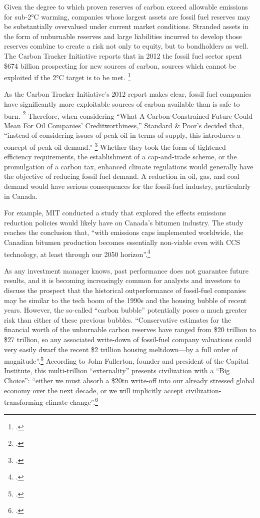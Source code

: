 \documentclass[10pt]{article}
\begin{document}
Given the degree to which proven reserves of carbon exceed allowable emissions for sub-2°C warming, companies whose largest assets are fossil fuel reserves may be substantially overvalued under current market conditions. 
Stranded assets in the form of unburnable reserves and large liabilities incurred to develop those reserves combine to create a risk not only to equity, but to bondholders as well.
The Carbon Tracker Initiative reports that in 2012 the fossil fuel sector spent \$674 billion prospecting for new sources of carbon, sources which cannot be exploited if the 2°C target is to be met. \footcite{CTI2013}


As the Carbon Tracker Initiative's 2012 report makes clear, fossil fuel companies have significantly more exploitable sources of carbon available than is safe to burn. \footcite{CTI2012}
Therefore, when considering ``What A Carbon-Constrained Future Could Mean For Oil Companies' Creditworthiness,'' Standard \& Poor's decided that, ``instead of considering issues of peak oil in terms of supply, this introduces a concept of peak oil demand.'' \footcite{SandPConstrained}
Whether they took the form of tightened efficiency requirements, the establishment of a cap-and-trade scheme, or the promulgation of a carbon tax, enhanced climate regulations would generally have the objective of reducing fossil fuel demand.
A reduction in oil, gas, and coal demand would have serious consequences for the fossil-fuel industry, particularly in Canada.



For example, MIT conducted a study that explored the effects  emissions reduction policies would likely have on Canada's bitumen industry.
The study reaches the conclusion that, ``with  emissions caps implemented worldwide, the Canadian bitumen production becomes essentially non-viable even with CCS technology, at least through our 2050 horizon''.\footcite{MITConstraints}



As any investment manager knows, past performance does not guarantee future results, and it is becoming increasingly common for analysts and investors to discuss the prospect that the historical outperformance of fossil-fuel companies may be similar to the tech boom of the 1990s and the housing bubble of recent years.
However, the so-called ``carbon bubble'' potentially poses a much greater risk than either of these previous bubbles.
``Conservative estimates for the financial worth of the unburnable carbon reserves have ranged from \$20 trillion to \$27 trillion, so any associated write-down of fossil-fuel company valuations could very easily dwarf the recent \$2 trillion housing meltdown—by a full order of magnitude''.\footcite[][p. 3]{FossilFreeInvesting}
According to John Fullerton, founder and president of the Capital Institute, this multi-trillion ``externality'' presents civilization with a ``Big Choice'': ``either we must absorb a \$20tn write-off into our already stressed global economy over the next decade, or we will implicitly accept civilization-transforming climate change''.\footcite{BigChoice}
\end{document}

